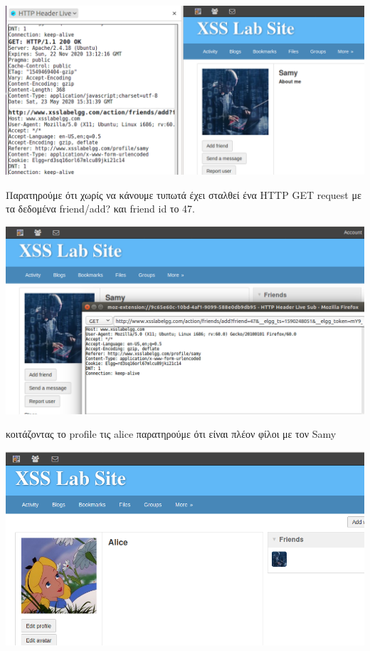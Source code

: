 \begin{center}
			\includegraphics[width=1\textwidth]{image/4.5.PNG}		
\end{center}
\noindent
Παρατηρούμε ότι χωρίς να κάνουμε τυπωτά έχει σταλθεί ένα HTTP GET request
με τα δεδομένα friend/add? και friend id το 47.
\begin{center}
			\includegraphics[width=1\textwidth]{image/4.6.PNG}		
\end{center}
\noindent
κοιτάζοντας το profile τις alice παρατηρούμε ότι είναι πλέον φίλοι με τον
Samy
\begin{center}
			\includegraphics[width=1\textwidth]{image/4.7.PNG}		
\end{center}

